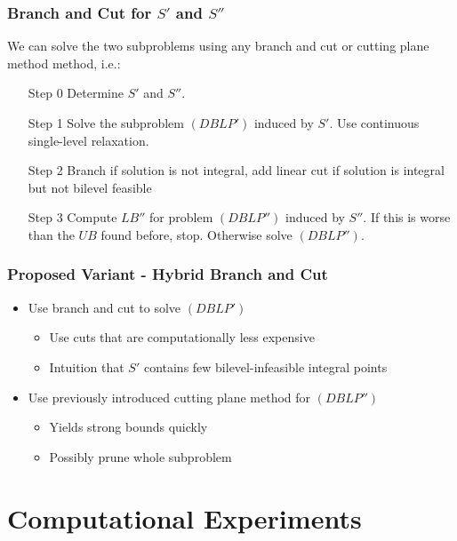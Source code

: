 \documentclass[11pt]{beamer}
\begin{document}
\begin{frame}
	\frametitle{Branch and Cut for $S'$ and $S''$}
	We can solve the two subproblems using any branch and cut or cutting plane method method, i.e.:
	\begin{itemize}
		\item[Step 0]Determine $S'$ and $S''$.
		\item[Step 1]Solve the subproblem $(DBLP')$ induced by $S'$. Use continuous single-level relaxation. 
		\item[Step 2]Branch if solution is not integral, add linear cut if solution is integral but not bilevel feasible
		\item[Step 3]Compute $LB''$ for problem $(DBLP'')$ induced by $S''$. If this is worse than the $UB$ found before, stop.
		Otherwise solve $(DBLP'')$.
	\end{itemize}
\end{frame}

\begin{frame}
	\frametitle{Proposed Variant - Hybrid Branch and Cut}
	\begin{itemize}
		\item Use branch and cut to solve $(DBLP')$
		\begin{itemize}
			\item Use cuts that are computationally less expensive
			\item Intuition that $S'$ contains few bilevel-infeasible integral points
		\end{itemize}
		\item Use previously introduced cutting plane method for $(DBLP'')$
		\begin{itemize}
			\item Yields strong bounds quickly
			\item Possibly prune whole subproblem
		\end{itemize}
	\end{itemize}
\end{frame}

\section{Computational Experiments}
\end{document}
